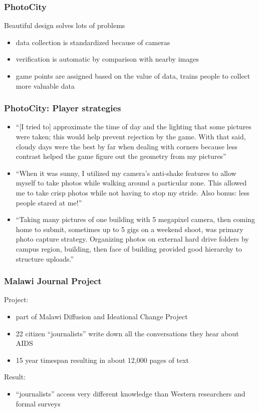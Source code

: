 \documentclass[aspectratio=169]{beamer}
\begin{document}
\begin{frame}
\frametitle{PhotoCity}

Beautiful design solves lots of problems
\begin{itemize}
\item data collection is standardized because of cameras
\pause
\item verification is automatic by comparison with nearby images
\pause
\item game points are assigned based on the value of data, trains people to collect more valuable data
\end{itemize}

\end{frame}
\begin{frame}
\frametitle{PhotoCity: Player strategies}

\begin{itemize}
\item ``[I tried to] approximate the time of day and the lighting that some pictures were taken; this would help prevent rejection by the game. With that said, cloudy days were the best by far when dealing with corners because less contrast helped the game figure out the geometry from my pictures''
\pause
\item ``When it was sunny, I utilized my camera's anti-shake features to allow myself to take photos while walking around a particular zone. This allowed me to take crisp photos while not having to stop my stride. Also bonus: less people stared at me!''
\pause
\item ``Taking many pictures of one building with 5 megapixel camera, then coming home to submit, sometimes up to 5 gigs on a weekend shoot, was primary photo capture strategy. Organizing photos on external hard drive folders by campus region, building, then face of building provided good hierarchy to structure uploads.''
\end{itemize}

\end{frame}
\begin{frame}
\frametitle{Malawi Journal Project}

Project:
\begin{itemize}
\item part of  Malawi Diffusion and Ideational Change Project
\item 22 citizen ``journalists'' write down all the conversations they hear about AIDS
\item 15 year timespan resulting in about 12,000 pages of text
\end{itemize}
\pause
\vfill
Result:
\begin{itemize}
\item ``journalists'' access very different knowledge than Western researchers and formal surveys
\end{itemize}

\end{frame}
\end{document}
